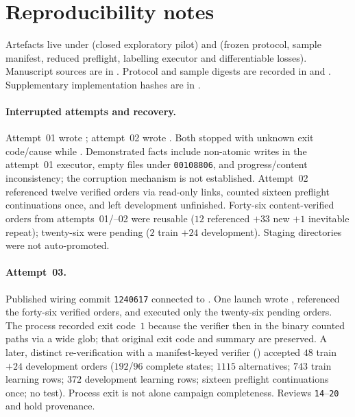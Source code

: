 \section{Reproducibility notes}

Artefacts live under
(closed exploratory pilot) and
(frozen protocol, sample manifest, reduced preflight, labelling executor and
differentiable losses).
Manuscript sources are in
.
Protocol and sample digests are recorded in
 and .
Supplementary implementation hashes are in
.

\paragraph{Interrupted attempts and recovery.}
Attempt~01 wrote ; attempt~02 wrote
. Both stopped with unknown exit code/cause
while . Demonstrated facts include non-atomic
writes in the attempt~01 executor, empty files under \texttt{00108806}, and
progress/content inconsistency; the corruption mechanism is not established.
Attempt~02 referenced twelve verified orders via read-only links, counted sixteen
preflight continuations once, and left development unfinished. Forty-six
content-verified orders from attempts~01/--02 were reusable
($12$ referenced $+33$ new $+1$ inevitable repeat); twenty-six were pending
($2$ train $+24$ development). Staging directories were not auto-promoted.

\paragraph{Attempt~03.}
Published wiring commit \texttt{1240617} connected
 to .
One launch wrote , referenced the forty-six
verified orders, and executed only the twenty-six pending orders. The process
recorded exit code~$1$ because the verifier then in the binary counted
 paths via a wide glob; that original exit code and summary
are preserved. A later, distinct re-verification with a manifest-keyed verifier
() accepted $48$ train $+24$ development orders
($192$/$96$ complete states; $1115$ alternatives; $743$ train learning rows;
$372$ development learning rows; sixteen preflight continuations once; no test).
Process exit is not alone campaign completeness. Reviews \texttt{14}--\texttt{20}
and  hold provenance.

